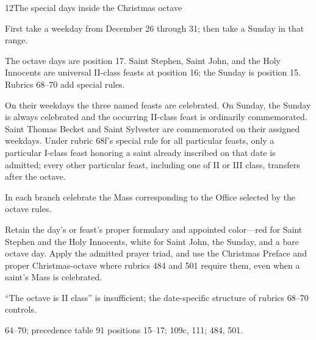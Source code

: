 \begin{casefile}{12}{The special days inside the Christmas octave}
\item[Calendar facts] First take a weekday from December 26 through 31; then take a Sunday in that range.
\item[Ranks and rows] The octave days are position 17.  Saint Stephen, Saint John, and the Holy Innocents are universal II-class feasts at position 16; the Sunday is position 15.  Rubrics 68--70 add special rules.
\item[Impeded item] On their weekdays the three named feasts are celebrated.  On Sunday, the Sunday is always celebrated and the occurring II-class feast is ordinarily commemorated.  Saint Thomas Becket and Saint Sylvester are commemorated on their assigned weekdays.  Under rubric 68f's special rule for all particular feasts, only a particular I-class feast honoring a saint already inscribed on that date is admitted; every other particular feast, including one of II or III class, transfers after the octave.
\item[Mass category] In each branch celebrate the Mass corresponding to the Office selected by the octave rules.
\item[Assembly] Retain the day's or feast's proper formulary and appointed color---red for Saint Stephen and the Holy Innocents, white for Saint John, the Sunday, and a bare octave day. Apply the admitted prayer triad, and use the Christmas Preface and proper Christmas-octave  where rubrics 484 and 501 require them, even when a saint's Mass is celebrated.
\item[Boundary] “The octave is II class” is insufficient; the date-specific structure of rubrics 68--70 controls.
\item[Rubric locus] 64--70; precedence table 91 positions 15--17; 109c, 111; 484, 501.
\end{casefile}


